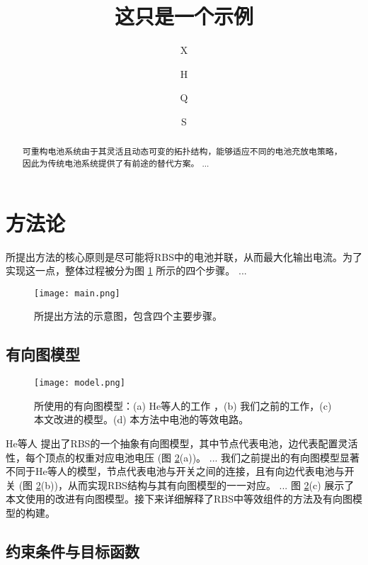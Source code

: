 \documentclass[a4paper,UTF8]{ctexart}
\title{这只是一个示例}
\author[1$\dag$]{X}
\author[1$\dag$]{H}
\author[1*]{Q}
\author[1,2]{S}
\affil[1]{R学院，中国}
\affil[2]{A学院，中国}
\affil[*]{通讯作者邮箱}
\affil[$\dag$]{这些作者对本文贡献相同。}
\begin{document}
\maketitle

\begin{abstract}
可重构电池系统由于其灵活且动态可变的拓扑结构，能够适应不同的电池充放电策略，因此为传统电池系统提供了有前途的替代方案。
...
\end{abstract}

\section{方法论}

所提出方法的核心原则是尽可能将RBS中的电池并联，从而最大化输出电流。为了实现这一点，整体过程被分为图 \ref{fig:main} 所示的四个步骤。
...

\begin{figure}[htbp]
    \centering
    \texttt{[image: main.png]}
    \caption{
        所提出方法的示意图，包含四个主要步骤。
    }
    \label{fig:main}
\end{figure}

\subsection{有向图模型}


\begin{figure}[htbp]
    \centering
    \texttt{[image: model.png]}
    \caption{{
        所使用的有向图模型：(a) He等人的工作 \cite{heExploringAdaptiveReconfiguration2013}，(b) 我们之前的工作，(c) 本文改进的模型。(d) 本方法中电池的等效电路。
    }}
    \label{fig:model}
\end{figure}


He等人 \cite{heExploringAdaptiveReconfiguration2013} 提出了RBS的一个抽象有向图模型，其中节点代表电池，边代表配置灵活性，每个顶点的权重对应电池电压 (图 \ref{fig:model}(a))。
...
我们之前提出的有向图模型显著不同于He等人的模型，节点代表电池与开关之间的连接，且有向边代表电池与开关 (图 \ref{fig:model}(b))，从而实现RBS结构与其有向图模型的一一对应。
...
图 \ref{fig:model}(c) 展示了本文使用的改进有向图模型。接下来详细解释了RBS中等效组件的方法及有向图模型的构建。

\subsection{约束条件与目标函数}
\end{document}
